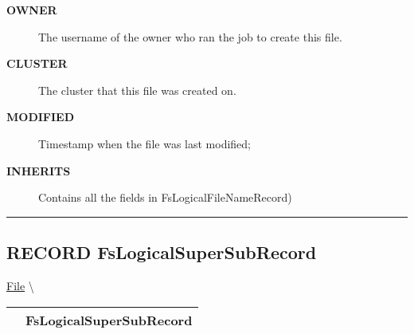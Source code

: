 \par
\begin{description}
\item [\colorbox{tagtype}{\color{white} \textbf{\textsf{OWNER}}}] The username of the owner who ran the job to create this file.
\end{description}






\par
\begin{description}
\item [\colorbox{tagtype}{\color{white} \textbf{\textsf{CLUSTER}}}] The cluster that this file was created on.
\end{description}







\par
\begin{description}
\item [\colorbox{tagtype}{\color{white} \textbf{\textsf{MODIFIED}}}] Timestamp when the file was last modified;
\end{description}






\par
\begin{description}
\item [\colorbox{tagtype}{\color{white} \textbf{\textsf{INHERITS}}}] Contains all the fields in FsLogicalFileNameRecord)
\end{description}



\rule{\linewidth}{0.5pt}
\subsection*{\textsf{\colorbox{headtoc}{\color{white} RECORD}
FsLogicalSuperSubRecord}}

\hypertarget{ecldoc:file.fslogicalsupersubrecord}{}
\hspace{0pt} \hyperlink{ecldoc:File}{File} \textbackslash 

{\renewcommand{\arraystretch}{1.5}
\begin{tabularx}{\textwidth}{|>{\raggedright\arraybackslash}l|X|}
\hline
\hspace{0pt}\mytexttt{\color{red} } & \textbf{FsLogicalSuperSubRecord} \\
\hline
\end{tabularx}
}

